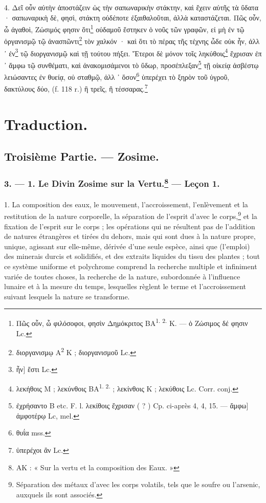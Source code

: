 \documentclass[a4paper, 11pt, oneside, polutonikogreek, french]{article}
\begin{document}
4. Δεῖ οὖν αὐτὴν ἀποστάζειν ὡς τὴν σαπωναρικὴν στάκτην, καὶ ἔχειν αὐτῆς τὰ ὕδατα · σαπωναρικὴ δὲ, φησὶ, στάκτη οὐδέποτε ἐξαιθαλοῦται, ἀλλὰ καταστάζεται. Πῶς οὖν, ὦ ἀγαθοὶ, Ζώσιμός φησιν ὅτι\footnote{Πῶς οὗν, ὦ φιλόσοφοι, φησὶν Δημόκριτος BA\textsuperscript{1. 2.} K. --- ὁ Ζώσιμος δέ φησιν Lc.} οὐδαμοῦ ἕστηκεν ὁ νοῦς τῶν γραφῶν, εἰ μὴ ἐν τῷ ὀργανισμῷ τῷ ἀνασπῶντι\footnote{διοργανισμῳ A\textsuperscript{2} K ; διοργανισμοῦ Lc.} τὸν χαλκόν · καὶ ὅτι τὸ πέρας τῆς τέχνης ὧδε οὐκ ἦν, ἀλλ ᾽ ἐν\footnote{ἦν] ἔστι Lc.} τῷ διοργανισμῷ καὶ τῇ τούτου πήξει. Ἕτεροι δὲ μόνον τοῖς ληκύθοις\footnote{λεκήθοις M ; λεκύνθοις BA\textsuperscript{1. 2.} ; λεκίνθοις K ; λεκύθοις Lc. Corr. conj.} ἕχρισαν ἐπ ᾽ ἄμφω τῷ συνθέματι, καὶ ἀνακομισάμενοι τὸ ὕδωρ, προσέπλεξαν\footnote{ἐχρήσαντο B etc. F. l. λεκίθοις ἔχρισαν ( ? ) Cp. ci-après 4, 4, 15. --- ἄμφω] ἀμφοτέρῳ Lc, mel.} τῇ οἰκείᾳ ἀσβέστῳ λειώσαντες ἐν θυείᾳ, οὐ σταθμῷ, ἀλλ ᾽ ὅσον\footnote{θυΐα mss.} ὑπερέχει τὸ ξηρὸν τοῦ ὑγροῦ, δακτύλους δύο, (f. 118 r.) ἢ τρεῖς, ἢ τέσσαρας.\footnote{ὑπερέχοι ἂν Lc.}

\bigskip
\centerline{\EightStarTaper}
\centerline{\EightStarTaper\EightStarTaper}
\bigskip
\clearpage
\setcounter{footnote}{0}
\section{Traduction.}
\subsection{Troisième Partie. --- Zosime.}
\subsubsection[3. --- 1. Le Divin Zosime sur la Vertu. --- Leçon 1.]{3. --- 1. Le Divin Zosime sur la Vertu.\footnote{AK : « Sur la vertu et la composition des Eaux. »} --- Leçon 1.}
\paragraph{}
1. La composition des eaux, le mouvement, l'accroissement, l'enlèvement et la restitution de la nature corporelle, la séparation de l'esprit d'avec le corps,\footnote{Séparation des métaux d'avec les corps volatils, tels que le soufre ou l'arsenic, auxquels ils sont associés.} et la fixation de l'esprit sur le corps ; les opérations qui ne résultent pas de l'addition de natures étrangères et tirées du dehors, mais qui sont dues à la nature propre, unique, agissant sur elle-même, dérivée d'une seule espèce, ainsi que (l'emploi) des minerais durcis et solidifiés, et des extraits liquides du tissu des plantes ; tout ce système uniforme et polychrome comprend la recherche multiple et infiniment variée de toutes choses, la recherche de la nature, subordonnée à l'influence lunaire et à la mesure du temps, lesquelles règlent le terme et l'accroissement suivant lesquels la nature se transforme.
\end{document}
